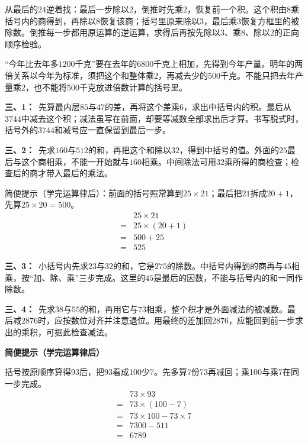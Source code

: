 \documentclass[multi=snippet,border=0pt]{standalone}
\newenvironment{snippet}[3]{\begin{minipage}{#1bp}\color{answerred}\fontsize{#2}{#3}\selectfont\raggedright}{\end{minipage}}
\begin{document}
\begin{snippet}{505}{11.5}{14}从最后的\(24\)逆着找：最后一步除以\(2\)，倒推时先乘\(2\)，恢复前一个积。这个积由\(8\)乘括号内的商得到，再除以\(8\)恢复该商；括号里原来除以\(3\)，最后乘\(3\)恢复方框里的被除数。倒推每一步都用原运算的逆运算，求得后再按先除以\(3\)、乘\(8\)、除以\(2\)的正向顺序检验。\end{snippet}
\begin{snippet}{505}{11.5}{14}“今年比去年多\(1200\)千克”要在去年的\(6800\)千克上相加，先得到今年产量。明年的两倍关系以今年为标准，须把这个和整体乘\(2\)，再减去少的\(500\)千克。不能只把去年产量乘\(2\)，也不能将\(500\)千克放进倍数计算的括号里。\end{snippet}
\begin{snippet}{505}{11.5}{14}\textbf{三、1：}\ 先算最内层\(85\)与\(47\)的差，再将这个差乘\(6\)，求出中括号内的积。最后从\(3744\)中减去这个积；减法虽写在前面，却要等减数全部求出后才算。书写脱式时，括号外的\(3744\)和减号应一直保留到最后一步。\end{snippet}
\begin{snippet}{505}{11.5}{14}\textbf{三、2：}\ 先求\(160\)与\(512\)的和，再把这个和除以\(32\)，得到中括号的值。外面的\(25\)最后与这个商相乘，不能一开始就与\(160\)相乘。中间除法可用\(32\)乘所得的商检查；检查后的商才带入最后的乘法。\par 简便提示（学完运算律后）：前面的括号照常算到\(25\times21\)；最后把\(21\)拆成\(20+1\)，先算\(25\times20=500\)。\[\begin{aligned}&25\times21\\={}&25\times(20+1)\\={}&500+25\\={}&525\end{aligned}\]\end{snippet}
\begin{snippet}{505}{11.5}{14}\textbf{三、3：}\ 小括号内先求\(23\)与\(32\)的和，它是\(275\)的除数。中括号内得到的商再与\(45\)相乘，按“加、除、乘”三步完成。这里的\(45\)是最后的因数，不能与括号内的和一同作除数。\end{snippet}
\begin{snippet}{505}{11.5}{14}\textbf{三、4：}\ 先求\(38\)与\(55\)的和，再用它与\(73\)相乘，整个积才是外面减法的被减数。最后减\(2876\)时，应按数位对齐并注意退位。用最终的差加回\(2876\)，应能回到前一步求出的乘积，可据此检查减法。\par\textbf{简便提示（学完运算律后）}\par 括号按原顺序算得93后，把93看成100少7。先多算7份73再减回；乘100与乘7在同一步完成。\[\begin{aligned}&73\times93\\={}&73\times(100-7)\\={}&73\times100-73\times7\\={}&7300-511\\={}&6789\end{aligned}\]\end{snippet}
\end{document}
